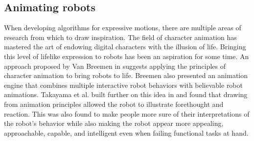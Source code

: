 \subsection{Animating robots}
When developing algorithms for expressive motions, there are multiple areas of research from which to draw inspiration. The field of character animation has mastered the art of endowing digital characters with the illusion of life. Bringing this level of lifelike expression to robots has been an aspiration for some time. An approach proposed by Van Breemen in \cite{breemen_bringing_2004} suggests applying the principles of character animation to bring robots to life. Breemen also presented an animation engine that combines multiple interactive robot behaviors with believable robot animations\cite{van_breemen_animation_2004}. Takayama et al. built further on this idea in \cite{takayama_expressing_2011} and found that drawing from animation principles allowed the robot to illustrate forethought and reaction. This was also found to make people more sure of their interpretations of the robot's behavior while also making the robot appear more appealing, approachable, capable, and intelligent even when failing functional tasks at hand. 

